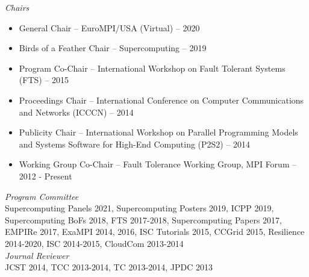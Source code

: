 {\sl Chairs}
\begin{itemize}
    \item General Chair -- EuroMPI/USA (Virtual) -- 2020
    \item Birds of a Feather Chair -- Supercomputing -- 2019
    \item Program Co-Chair -- International Workshop on Fault Tolerant Systems
        (FTS) -- 2015
    \item Proceedings Chair -- International Conference on Computer
        Communications and Networks (ICCCN) -- 2014
    \item Publicity Chair -- International Workshop on Parallel Programming
        Models and Systems Software for High-End Computing (P2S2) -- 2014
    \item Working Group Co-Chair -- Fault Tolerance Working Group, MPI Forum -- 2012 - Present
\end{itemize}

{\sl Program Committee} \\
Supercomputing Panels 2021,
Supercomputing Posters 2019,
ICPP 2019,
Supercomputing BoFs 2018,
FTS 2017-2018,
Supercomputing Papers 2017,
EMPIRe 2017,
ExaMPI 2014, 2016,
ISC Tutorials 2015,
CCGrid 2015,
Resilience 2014-2020,
ISC 2014-2015,
CloudCom 2013-2014 \\

{\sl Journal Reviewer} \\
JCST 2014, TCC 2013-2014, TC 2013-2014, JPDC 2013 \\

